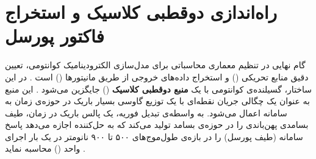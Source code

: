 \documentclass[12pt,a4paper]{report}
\begin{document}
\section{راه‌اندازی دوقطبی کلاسیک و استخراج فاکتور پورسل}
گام نهایی در تنظیم معماری محاسباتی  برای مدل‌سازی الکترودینامیک کوانتومی، تعیین دقیق منابع تحریکی () و استخراج داده‌های خروجی از طریق مانیتورها () است \cite{novotny,taflove}. در این ساختار، گسیلنده‌ی کوانتومی با یک \textbf{منبع دوقطبی کلاسیک} () جایگزین می‌شود \cite{novotny}. این منبع به عنوان یک چگالی جریان نقطه‌ای با یک توزیع گاوسی بسیار باریک در حوزه‌ی زمان به سامانه اعمال می‌شود. به واسطه‌ی تبدیل فوریه، یک پالس باریک در زمان، طیف بسامدی پهن‌باندی را در حوزه‌ی بسامد تولید می‌کند که به حل‌کننده اجازه می‌دهد پاسخ سامانه (طیف پورسل) را در بازه‌ی طول‌موج‌های ۵۰۰ تا ۹۰۰ نانومتر در یک بار اجرای واحد () محاسبه نماید \cite{taflove}.
\end{document}
